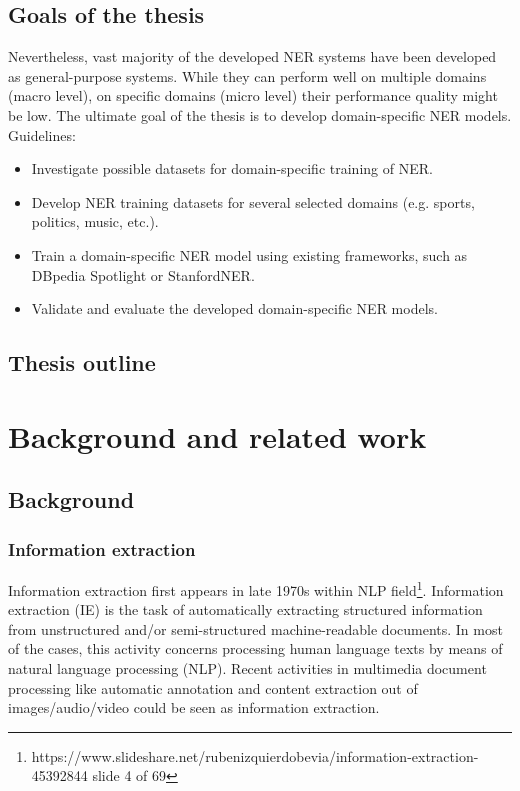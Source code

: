\documentclass[thesis=M,english]{FITthesis}[2018/05/30]
\begin{document}
\begin{introduction}
\section{Goals of the thesis}	
	Nevertheless, vast majority of the developed NER systems have been developed as general-purpose systems. While they can perform well on multiple domains (macro level), on specific domains (micro level) their performance quality might be low. The ultimate goal of the thesis is to develop domain-specific NER models. Guidelines:
\begin{itemize}
	\item Investigate possible datasets for domain-specific training of NER.
	\item Develop NER training datasets for several selected domains (e.g. sports,
politics, music, etc.).
	\item Train a domain-specific NER model using existing frameworks, such as
DBpedia Spotlight or StanfordNER.
	\item Validate and evaluate the developed domain-specific NER models. 
\end{itemize}	
	
\section{Thesis outline}
	

\end{introduction}

\chapter{Background and related work}\label{}

	
\section{Background}

\subsection{Information extraction}
	Information extraction first appears in late 1970s within NLP field\footnote{https://www.slideshare.net/rubenizquierdobevia/information-extraction-45392844 slide 4 of 69}. 
Information extraction (IE) \cite{wiki:IE} is the task of automatically extracting structured information from unstructured and/or semi-structured machine-readable documents. In most of the cases, this activity concerns processing human language texts by means of natural language processing (NLP). Recent activities in multimedia document processing like automatic annotation and content extraction out of images/audio/video could be seen as information extraction.
\end{document}
